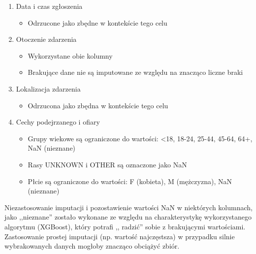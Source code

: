 \documentclass{classrep}
\begin{document}
{{{\begin{enumerate}
                    \item Data i czas zgłoszenia
                    \begin{itemize}
                        \item Odrzucone jako zbędne w kontekście tego celu
                    \end{itemize}
                    \item Otoczenie zdarzenia
                    \begin{itemize}
                        \item Wykorzystane obie kolumny
                        \item Brakujące dane nie są imputowane ze względu na znacząco liczne braki
                    \end{itemize}
                    \item Lokalizacja zdarzenia
                    \begin{itemize}
                        \item Odrzucona jako zbędna w kontekście tego celu
                    \end{itemize}
                    \item Cechy podejrzanego i ofiary
                    \begin{itemize}
                        \item Grupy wiekowe są ograniczone do wartości: <18, 18-24, 25-44, 45-64, 64+, NaN (nieznane)
                        \item Rasy UNKNOWN i OTHER są oznaczone jako NaN
                        \item Płcie są ograniczone do wartości: F (kobieta), M (mężczyzna), NaN (nieznane)
                    \end{itemize}
                \end{enumerate}
                Niezastosowanie imputacji i pozostawienie wartości NaN w niektórych
                kolumnach, jako ,,nieznane'' zostało wykonane ze względu na
                charakterystykę wykorzystanego algorytmu (XGBoost), który potrafi ,,
                radzić'' sobie z brakującymi wartościami. Zastosowanie prostej
                imputacji (np. wartość najczęstsza) w przypadku silnie wybrakowanych
                danych mogłoby znacząco obciążyć zbiór.

}}}
\end{document}
